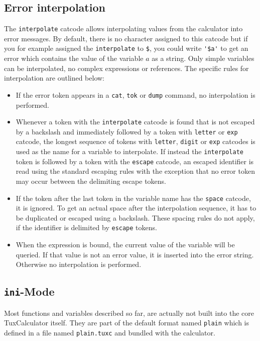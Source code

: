 \documentclass[10pt]{article}
\begin{document}
    \subsection{Error interpolation}\label{subsec:errinterp}
    The \verb|interpolate| catcode allows interpolating values from the calculator into error messages.
    By default, there is no character assigned to this catcode but if you for example assigned the \verb|interpolate| to \verb|$|, you could write \verb|'$a'| to get an error which contains the value of the variable $ a $ as a string.
    Only simple variables can be interpolated, no complex expressions or references.
    The specific rules for interpolation are outlined below:
    \begin{itemize}
        \item If the error token appears in a \verb|cat|, \verb|tok| or \verb|dump| command, no interpolation is performed.
        \item Whenever a token with the \verb|interpolate| catcode is found that is not escaped by a backslash and immediately followed by a token with \verb|letter| or \verb|exp| catcode, the longest sequence of tokens with \verb|letter|, \verb|digit| or \verb|exp| catcodes is used as the name for a variable to interpolate.
              If instead the \verb|interpolate| token is followed by a token with the \verb|escape| catcode, an escaped identifier is read using the standard escaping rules with the exception that no error token may occur between the delimiting escape tokens.
        \item If the token after the last token in the variable name has the \verb|space| catcode, it is ignored.
              To get an actual space after the interpolation sequence, it has to be duplicated or escaped using a backslash.
              These spacing rules do not apply, if the identifier is delimited by \verb|escape| tokens.
        \item When the expression is bound, the current value of the variable will be queried.
              If that value is not an error value, it is inserted into the error string.
              Otherwise no interpolation is performed.
    \end{itemize}
    
    \subsection{\texttt{ini}-Mode}\label{subsec:inimode}
    Most functions and variables described so far, are actually not built into the core TuxCalculator itself.
    They are part of the default format named \verb|plain| which is defined in a file named \verb|plain.tuxc| and bundled with the calculator.
    
\end{document}
